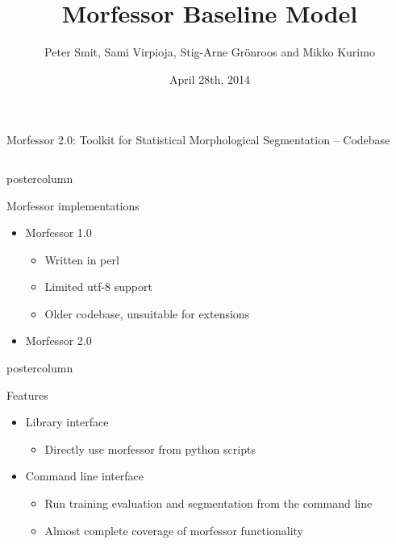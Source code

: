 \documentclass[final]{beamer} %
\title[Morfessor Model]{Morfessor Baseline Model}
\author[Smit et. al]{Peter Smit, Sami Virpioja, Stig-Arne Grönroos and Mikko Kurimo}
\institute[Aalto University]{Aalto University}
\date{April 28th, 2014}
\begin{document}
  \begin{frame}{Morfessor 2.0: Toolkit for Statistical Morphological Segmentation -- Codebase} 
\begin{columns}

\begin{column}{.3\textwidth}

      \begin{beamercolorbox}[center,wd=\textwidth]{postercolumn}
 \begin{block}{Morfessor implementations}
              \begin{itemize}
              \item Morfessor 1.0
                \begin{itemize}
                \item Written in perl
		\item Limited utf-8 support
		\item Older codebase, unsuitable for extensions
                \end{itemize}
              \item Morfessor 2.0
              \end{itemize}              
            \end{block}
            
	\end{beamercolorbox}


      \begin{beamercolorbox}[center,wd=\textwidth]{postercolumn}
 \begin{block}{Features}
              \begin{itemize}
              \item Library interface
                \begin{itemize}
                \item Directly use morfessor from python scripts
                \end{itemize}
              \item Command line interface
                \begin{itemize}
                \item Run training evaluation and segmentation from the command line
                \item Almost complete coverage of morfessor functionality
                \end{itemize}
              \end{itemize}              
            \end{block}
            

\end{beamercolorbox}
\end{column}
\end{columns}
\end{frame}
\end{document}
